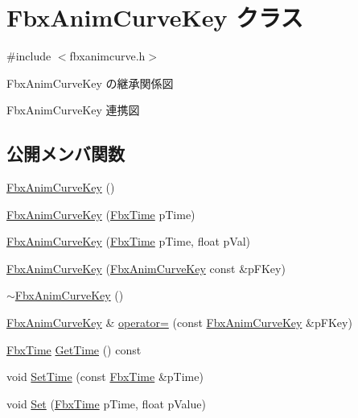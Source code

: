 \hypertarget{class_fbx_anim_curve_key}{}\section{Fbx\+Anim\+Curve\+Key クラス}
\label{class_fbx_anim_curve_key}


{\ttfamily \#include $<$fbxanimcurve.\+h$>$}



Fbx\+Anim\+Curve\+Key の継承関係図


Fbx\+Anim\+Curve\+Key 連携図
\subsection*{公開メンバ関数}
\begin{DoxyCompactItemize}
\item 
\hyperlink{class_fbx_anim_curve_key_acc70533fb017bc71b617aaa37ee2e19f}{Fbx\+Anim\+Curve\+Key} ()
\item 
\hyperlink{class_fbx_anim_curve_key_a5fc23a90c53bc0655161813ee4f6ae00}{Fbx\+Anim\+Curve\+Key} (\hyperlink{class_fbx_time}{Fbx\+Time} p\+Time)
\item 
\hyperlink{class_fbx_anim_curve_key_a3e967d8e8d05da27ba82dcebfe2533fc}{Fbx\+Anim\+Curve\+Key} (\hyperlink{class_fbx_time}{Fbx\+Time} p\+Time, float p\+Val)
\item 
\hyperlink{class_fbx_anim_curve_key_ab5d7663cc4993863b80b13e0b5dca835}{Fbx\+Anim\+Curve\+Key} (\hyperlink{class_fbx_anim_curve_key}{Fbx\+Anim\+Curve\+Key} const \&p\+F\+Key)
\item 
\hyperlink{class_fbx_anim_curve_key_af0269dd6206c85565ed29b01b39df8ff}{$\sim$\+Fbx\+Anim\+Curve\+Key} ()
\item 
\hyperlink{class_fbx_anim_curve_key}{Fbx\+Anim\+Curve\+Key} \& \hyperlink{class_fbx_anim_curve_key_a13c344143cd73f6809edbbb91df08c0e}{operator=} (const \hyperlink{class_fbx_anim_curve_key}{Fbx\+Anim\+Curve\+Key} \&p\+F\+Key)
\item 
\hyperlink{class_fbx_time}{Fbx\+Time} \hyperlink{class_fbx_anim_curve_key_aae0882b53b31502cb30ea35de028837f}{Get\+Time} () const
\item 
void \hyperlink{class_fbx_anim_curve_key_a6ebc96b8346a345534c0eb2e1b6d9291}{Set\+Time} (const \hyperlink{class_fbx_time}{Fbx\+Time} \&p\+Time)
\item 
void \hyperlink{class_fbx_anim_curve_key_afdab5f0d38bedc7c4715aaa6a51d4370}{Set} (\hyperlink{class_fbx_time}{Fbx\+Time} p\+Time, float p\+Value)

\end{DoxyCompactItemize}
